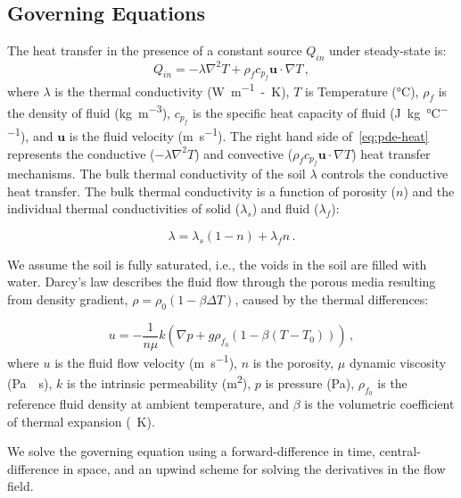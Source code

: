 \documentclass[Journal,letterpaper,InsideFigs]{ascelike-new}
\begin{document}
\subsection*{Governing Equations} 
The heat transfer in the presence of a constant source $Q_{in}$ under steady-state is: 
\begin{equation}
Q_{in} = - \lambda \nabla^2 T + \rho_f c_{p_f} \mathbf{u} \cdot \nabla T\,,
\label{eq:pde-heat}
\end{equation}
where $\lambda$ is the thermal conductivity (\si{\watt\per\meter-\kelvin}), $T$ is Temperature (\si{\celsius}), $\rho_f$ is the density of fluid (\si{\kilo\gram\per\meter\cubed}), $c_{p_f}$ is the specific heat capacity of fluid (\si{\joule\per\kilo\gram\per\celsius}), and $\mathbf{u}$ is the fluid velocity (\si{\meter\per\second}). The right hand side of~\cref{eq:pde-heat} represents the conductive ($- \lambda \nabla^2 T$) and convective ($ \rho_f c_{p_f} \mathbf{u} \cdot \nabla T$) heat transfer mechanisms. The bulk thermal conductivity of the soil $\lambda$ controls the conductive heat transfer. The bulk thermal conductivity is a function of porosity ($n$) and the individual thermal conductivities of solid ($\lambda_s$) and fluid ($\lambda_f$):

\begin{equation}
\lambda = \lambda_s ( 1 - n) + \lambda_f n\,.
\end{equation}

We assume the soil is fully saturated, i.e., the voids in the soil are filled with water. Darcy's law describes the fluid flow through the porous media resulting from density gradient, $\rho = \rho_0 (1 - \beta \Delta T)$, caused by the thermal differences:

\begin{equation}
u = - \frac{1}{n \mu} k \left(\nabla p + g \rho_{f_0} \left(1 - \beta (T - T_0)\right)\right)\,,
\end{equation}
where $u$ is the fluid flow velocity (\si{\meter\per\second}), $n$ is the porosity, $\mu$ dynamic viscosity (\si{\pascal\cdot\second}), $k$ is the intrinsic permeability (\si{\meter\squared}), $p$ is pressure (\si{\pascal}), $\rho_{f_0}$ is the reference fluid density at ambient temperature, and $\beta$ is the volumetric coefficient of thermal expansion (\si{\per\kelvin}). 

We solve the governing equation using a forward-difference in time, central-difference in space, and an upwind scheme for solving the derivatives in the flow field. 
\end{document}
